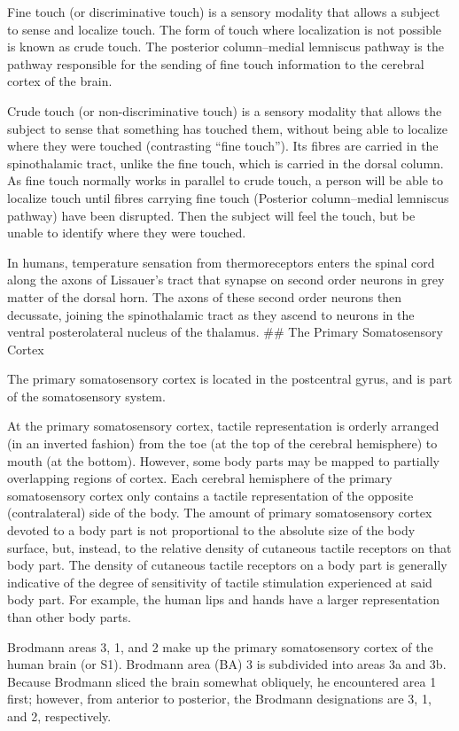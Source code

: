 Fine touch (or discriminative touch) is a sensory modality that allows a subject to sense and localize touch. The form of touch where localization is not possible is known as crude touch. The posterior column--medial lemniscus pathway is the pathway responsible for the sending of fine touch information to the cerebral cortex of the brain.

Crude touch (or non-discriminative touch) is a sensory modality that allows the subject to sense that something has touched them, without being able to localize where they were touched (contrasting ``fine touch''). Its fibres are carried in the spinothalamic tract, unlike the fine touch, which is carried in the dorsal column. As fine touch normally works in parallel to crude touch, a person will be able to localize touch until fibres carrying fine touch (Posterior column--medial lemniscus pathway) have been disrupted. Then the subject will feel the touch, but be unable to identify where they were touched.

In humans, temperature sensation from thermoreceptors enters the spinal cord along the axons of Lissauer's tract that synapse on second order neurons in grey matter of the dorsal horn. The axons of these second order neurons then decussate, joining the spinothalamic tract as they ascend to neurons in the ventral posterolateral nucleus of the thalamus.
\#\# The Primary Somatosensory Cortex

The primary somatosensory cortex is located in the postcentral gyrus, and is part of the somatosensory system.

At the primary somatosensory cortex, tactile representation is orderly arranged (in an inverted fashion) from the toe (at the top of the cerebral hemisphere) to mouth (at the bottom). However, some body parts may be mapped to partially overlapping regions of cortex. Each cerebral hemisphere of the primary somatosensory cortex only contains a tactile representation of the opposite (contralateral) side of the body. The amount of primary somatosensory cortex devoted to a body part is not proportional to the absolute size of the body surface, but, instead, to the relative density of cutaneous tactile receptors on that body part. The density of cutaneous tactile receptors on a body part is generally indicative of the degree of sensitivity of tactile stimulation experienced at said body part. For example, the human lips and hands have a larger representation than other body parts.

Brodmann areas 3, 1, and 2 make up the primary somatosensory cortex of the human brain (or S1). Brodmann area (BA) 3 is subdivided into areas 3a and 3b. Because Brodmann sliced the brain somewhat obliquely, he encountered area 1 first; however, from anterior to posterior, the Brodmann designations are 3, 1, and 2, respectively.

